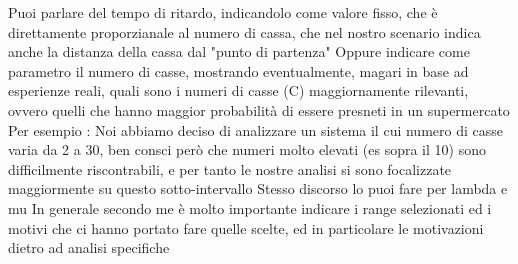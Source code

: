 Puoi parlare del tempo di ritardo, indicandolo come valore fisso, che è direttamente proporzianale al numero di cassa, che nel nostro scenario indica anche la distanza della cassa dal "punto di partenza"
 Oppure indicare come parametro il numero di casse, mostrando eventualmente, magari in base ad esperienze reali, quali sono i numeri di casse (C) maggiornamente rilevanti, ovvero quelli che hanno maggior probabilità di essere presneti in un supermercato
 Per esempio : Noi abbiamo deciso di analizzare un sistema il cui numero di casse varia da 2 a 30, ben consci però che numeri molto elevati (es sopra il 10) sono difficilmente riscontrabili, e per tanto le nostre analisi si sono focalizzate maggiormente su questo sotto-intervallo
 Stesso discorso lo puoi fare per lambda e mu
 In generale secondo me è molto importante indicare i range selezionati ed i motivi che ci hanno portato fare quelle scelte, ed in particolare le motivazioni dietro ad analisi specifiche
